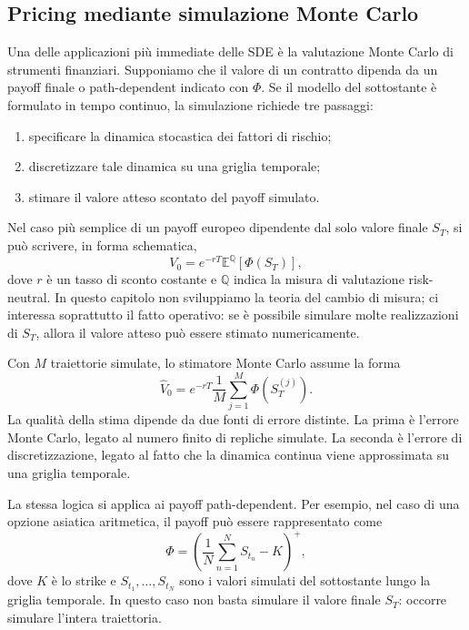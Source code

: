 \subsection*{Pricing mediante simulazione Monte Carlo}

Una delle applicazioni pi\`{u} immediate delle SDE \`{e} la valutazione
Monte Carlo di strumenti finanziari. Supponiamo che il valore di un
contratto dipenda da un payoff finale o path-dependent indicato con
$\Phi$. Se il modello del sottostante \`{e} formulato in tempo continuo,
la simulazione richiede tre passaggi:

\begin{enumerate}
\item specificare la dinamica stocastica dei fattori di rischio;
\item discretizzare tale dinamica su una griglia temporale;
\item stimare il valore atteso scontato del payoff simulato.
\end{enumerate}

Nel caso pi\`{u} semplice di un payoff europeo dipendente dal solo valore
finale $S_T$, si pu\`{o} scrivere, in forma schematica,
\[
V_0
=
e^{-rT}
\mathbb{E}^{\mathbb{Q}}\left[\Phi(S_T)\right],
\]
dove $r$ \`{e} un tasso di sconto costante e $\mathbb{Q}$ indica la
misura di valutazione risk-neutral. In questo capitolo non sviluppiamo la
teoria del cambio di misura; ci interessa soprattutto il fatto operativo:
se \`{e} possibile simulare molte realizzazioni di $S_T$, allora il valore
atteso pu\`{o} essere stimato numericamente.

Con $M$ traiettorie simulate, lo stimatore Monte Carlo assume la forma
\[
\widehat{V}_0
=
e^{-rT}
\frac{1}{M}
\sum_{j=1}^{M}
\Phi\left(S_T^{(j)}\right).
\]
La qualit\`{a} della stima dipende da due fonti di errore distinte. La
prima \`{e} l'errore Monte Carlo, legato al numero finito di repliche
simulate. La seconda \`{e} l'errore di discretizzazione, legato al fatto
che la dinamica continua viene approssimata su una griglia temporale.

La stessa logica si applica ai payoff path-dependent. Per esempio, nel
caso di una opzione asiatica aritmetica, il payoff pu\`{o} essere
rappresentato come
\[
\Phi
=
\left(
\frac{1}{N}
\sum_{n=1}^{N}
S_{t_n}
-
K
\right)^{+},
\]
dove $K$ \`{e} lo strike e $S_{t_1},\ldots,S_{t_N}$ sono i valori simulati
del sottostante lungo la griglia temporale. In questo caso non basta
simulare il valore finale $S_T$: occorre simulare l'intera traiettoria.


